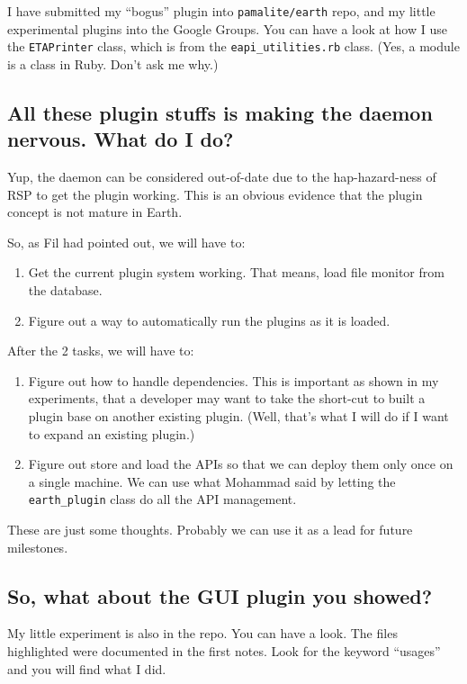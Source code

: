 \documentclass{article}
\begin{document}
I have submitted my ``bogus'' plugin into \texttt{pamalite/earth} repo, and my little experimental plugins into the Google Groups. You can have a look at how I use the \texttt{ETAPrinter} class, which is from the \texttt{eapi\_utilities.rb} class. (Yes, a module is a class in Ruby. Don't ask me why.) 

\subsection*{All these plugin stuffs is making the daemon nervous. What do I do?}

Yup, the daemon can be considered out-of-date due to the hap-hazard-ness of RSP to get the plugin working. This is an obvious evidence that the plugin concept is not mature in Earth. 

So, as Fil had pointed out, we will have to:

\begin{enumerate}
   \item Get the current plugin system working. That means, load file monitor from the database. 
   \item Figure out a way to automatically run the plugins as it is loaded. 
\end{enumerate}

After the 2 tasks, we will have to:

\begin{enumerate}
   \item Figure out how to handle dependencies. This is important as shown in my experiments, that a developer may want to take the short-cut to built a plugin base on another existing plugin. (Well, that's what I will do if I want to expand an existing plugin.)
   \item Figure out store and load the APIs so that we can deploy them only once on a single machine. We can use what Mohammad said by letting the \texttt{earth\_plugin} class do all the API management.  
\end{enumerate}

These are just some thoughts. Probably we can use it as a lead for future milestones. 

\subsection*{So, what about the GUI plugin you showed?}

My little experiment is also in the repo. You can have a look. The files highlighted were documented in the first notes. Look for the keyword ``usages'' and you will find what I did. 
\end{document}

